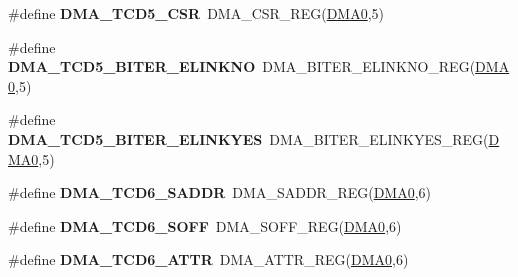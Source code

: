 \begin{DoxyCompactItemize}
\item 
\#define {\bfseries D\+M\+A\+\_\+\+T\+C\+D5\+\_\+\+C\+SR}~D\+M\+A\+\_\+\+C\+S\+R\+\_\+\+R\+EG(\hyperlink{group__DMA__Peripheral__Access__Layer_ga4103044f9ca209772f513dc694513ffb}{D\+M\+A0},5)\hypertarget{group__DMA__Register__Accessor__Macros_ga21f0f7acf8241ec5707391950832b8bf}{}\label{group__DMA__Register__Accessor__Macros_ga21f0f7acf8241ec5707391950832b8bf}

\item 
\#define {\bfseries D\+M\+A\+\_\+\+T\+C\+D5\+\_\+\+B\+I\+T\+E\+R\+\_\+\+E\+L\+I\+N\+K\+NO}~D\+M\+A\+\_\+\+B\+I\+T\+E\+R\+\_\+\+E\+L\+I\+N\+K\+N\+O\+\_\+\+R\+EG(\hyperlink{group__DMA__Peripheral__Access__Layer_ga4103044f9ca209772f513dc694513ffb}{D\+M\+A0},5)\hypertarget{group__DMA__Register__Accessor__Macros_ga16a45975974259d9c0822a80fc4235b5}{}\label{group__DMA__Register__Accessor__Macros_ga16a45975974259d9c0822a80fc4235b5}

\item 
\#define {\bfseries D\+M\+A\+\_\+\+T\+C\+D5\+\_\+\+B\+I\+T\+E\+R\+\_\+\+E\+L\+I\+N\+K\+Y\+ES}~D\+M\+A\+\_\+\+B\+I\+T\+E\+R\+\_\+\+E\+L\+I\+N\+K\+Y\+E\+S\+\_\+\+R\+EG(\hyperlink{group__DMA__Peripheral__Access__Layer_ga4103044f9ca209772f513dc694513ffb}{D\+M\+A0},5)\hypertarget{group__DMA__Register__Accessor__Macros_ga07c9d47975d63acab5c79b21b8fa0631}{}\label{group__DMA__Register__Accessor__Macros_ga07c9d47975d63acab5c79b21b8fa0631}

\item 
\#define {\bfseries D\+M\+A\+\_\+\+T\+C\+D6\+\_\+\+S\+A\+D\+DR}~D\+M\+A\+\_\+\+S\+A\+D\+D\+R\+\_\+\+R\+EG(\hyperlink{group__DMA__Peripheral__Access__Layer_ga4103044f9ca209772f513dc694513ffb}{D\+M\+A0},6)\hypertarget{group__DMA__Register__Accessor__Macros_ga0f41c78fcfe67fb12a25ecf7df8f9127}{}\label{group__DMA__Register__Accessor__Macros_ga0f41c78fcfe67fb12a25ecf7df8f9127}

\item 
\#define {\bfseries D\+M\+A\+\_\+\+T\+C\+D6\+\_\+\+S\+O\+FF}~D\+M\+A\+\_\+\+S\+O\+F\+F\+\_\+\+R\+EG(\hyperlink{group__DMA__Peripheral__Access__Layer_ga4103044f9ca209772f513dc694513ffb}{D\+M\+A0},6)\hypertarget{group__DMA__Register__Accessor__Macros_gac85de51a9a8986d8268f7f1f27bfb00f}{}\label{group__DMA__Register__Accessor__Macros_gac85de51a9a8986d8268f7f1f27bfb00f}

\item 
\#define {\bfseries D\+M\+A\+\_\+\+T\+C\+D6\+\_\+\+A\+T\+TR}~D\+M\+A\+\_\+\+A\+T\+T\+R\+\_\+\+R\+EG(\hyperlink{group__DMA__Peripheral__Access__Layer_ga4103044f9ca209772f513dc694513ffb}{D\+M\+A0},6)\hypertarget{group__DMA__Register__Accessor__Macros_ga0bce2367a1fe49658e389384bede7937}{}\label{group__DMA__Register__Accessor__Macros_ga0bce2367a1fe49658e389384bede7937}


\end{DoxyCompactItemize}
